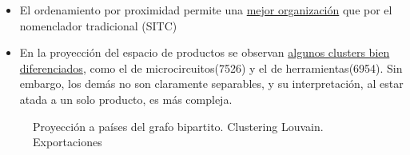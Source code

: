 \documentclass[compress]{beamer}
\begin{document}
\begin{frame}

\begin{itemize}[label=\faRebel]
\item El ordenamiento por proximidad permite una \underline{mejor organización} que por el nomenclador tradicional (SITC\citep{WTO2017})
\item En la proyección del espacio de productos se observan \underline{algunos clusters bien diferenciados}, como el de microcircuitos(7526) y el de herramientas(6954). Sin embargo, los demás no son claramente separables, y su interpretación, al estar atada a un solo producto, es más compleja.

\end{itemize}
\end{frame}


\begin{frame}
\begin{figure}
\centering
{}
\caption{Proyección a países del grafo bipartito. Clustering Louvain. Exportaciones}
\label{fig:mapas_proyeccion_louvain}
\end{figure}
\end{frame}
\end{document}
